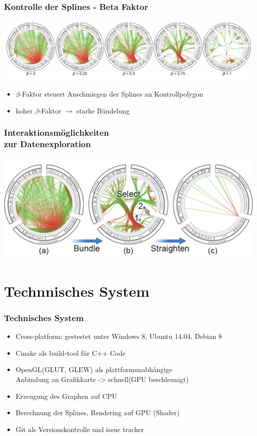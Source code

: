 \documentclass[11pt]{beamer}
\begin{document}
\begin{frame}
\frametitle{Kontrolle der Splines - Beta Faktor}
\includegraphics[scale=0.35]{./Algorithm_BetaFactor_Results.png}
\begin{itemize}
\bigskip
\item $\beta$-Faktor steuert Anschmiegen der Splines an Kontrollpolygon
\item hoher $\beta$-Faktor $\rightarrow$ starke Bündelung
\end{itemize}

\end{frame}

\begin{frame}
\frametitle{Interaktionsmöglichkeiten\\ zur Datenexploration}
\includegraphics[scale=0.30]{./Algorithm_Interaction.png}
\end{frame}

\section{Technnisches System}
\begin{frame}
\frametitle{Technisches System}

\begin{itemize}
\item Cross-platform: gestestet unter Windows 8, Ubuntu 14.04, Debian 8
\item Cmake als build-tool für C++ Code
\item OpenGL(GLUT, GLEW) als plattformunabhängige  
\\ Anbindung an Grafikkarte -> schnell(GPU beschleunigt) 
\item Erzeugung des Graphen auf CPU
\item Berechnung der Splines, Rendering auf GPU (Shader)
\item Git als Versionskontrolle und issue tracker
\end{itemize}

\end{frame}
\end{document}
